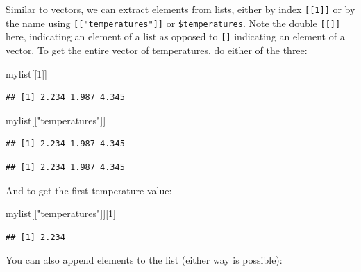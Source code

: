 \documentclass[
]{book}
\newenvironment{Shaded}{\begin{snugshade}}{\end{snugshade}}
\newcommand{\DecValTok}[1]{\textcolor[rgb]{0.00,0.00,0.81}{#1}}
\newcommand{\NormalTok}[1]{#1}
\newcommand{\SpecialCharTok}[1]{\textcolor[rgb]{0.00,0.00,0.00}{#1}}
\newcommand{\StringTok}[1]{\textcolor[rgb]{0.31,0.60,0.02}{#1}}
\begin{document}
Similar to vectors, we can extract elements from lists, either by index \texttt{{[}{[}1{]}{]}} or by the name using \texttt{{[}{[}"temperatures"{]}{]}} or \texttt{\$temperatures}. Note the double \texttt{{[}{[}{]}{]}} here, indicating an element of a list as opposed to \texttt{{[}{]}} indicating an element of a vector. To get the entire vector of temperatures, do either of the three:

\begin{Shaded}
\begin{Highlighting}[]
\NormalTok{mylist[[}\DecValTok{1}\NormalTok{]]}
\end{Highlighting}
\end{Shaded}

\begin{verbatim}
## [1] 2.234 1.987 4.345
\end{verbatim}

\begin{Shaded}
\begin{Highlighting}[]
\NormalTok{mylist[[}\StringTok{"temperatures"}\NormalTok{]]}
\end{Highlighting}
\end{Shaded}

\begin{verbatim}
## [1] 2.234 1.987 4.345
\end{verbatim}

\begin{Shaded}
\end{Shaded}

\begin{verbatim}
## [1] 2.234 1.987 4.345
\end{verbatim}

And to get the first temperature value:

\begin{Shaded}
\begin{Highlighting}[]
\NormalTok{mylist[[}\StringTok{"temperatures"}\NormalTok{]][}\DecValTok{1}\NormalTok{]}
\end{Highlighting}
\end{Shaded}

\begin{verbatim}
## [1] 2.234
\end{verbatim}

You can also append elements to the list (either way is possible):
\end{document}
